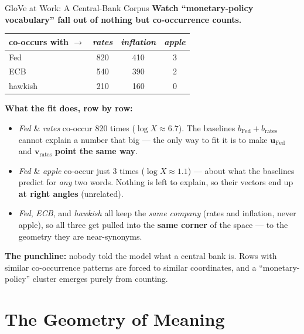 \begin{frame}{GloVe at Work: A Central-Bank Corpus}
\textbf{Watch ``monetary-policy vocabulary'' fall out of nothing but co-occurrence counts.}
\begin{center}
\footnotesize
\begin{tabular}{l c c c}
\toprule
 co-occurs with $\rightarrow$ & \emph{rates} & \emph{inflation} & \emph{apple} \\
\midrule
Fed      & 820 & 410 & 3 \\
ECB      & 540 & 390 & 2 \\
hawkish  & 210 & 160 & 0 \\
\bottomrule
\end{tabular}
\end{center}
\smallskip
\textbf{What the fit does, row by row:}
\begin{itemize}
\small
\item \emph{Fed} \& \emph{rates} co-occur 820 times ($\log X \approx 6.7$). The baselines $b_{\text{Fed}} + b_{\text{rates}}$ cannot explain a number that big --- the only way to fit it is to make $\mathbf{u}_{\text{Fed}}$ and $\mathbf{v}_{\text{rates}}$ \textbf{point the same way}.
\item \emph{Fed} \& \emph{apple} co-occur just 3 times ($\log X \approx 1.1$) --- about what the baselines predict for \emph{any} two words. Nothing is left to explain, so their vectors end up \textbf{at right angles} (unrelated).
\item \emph{Fed}, \emph{ECB}, and \emph{hawkish} all keep the \emph{same company} (rates and inflation, never apple), so all three get pulled into the \textbf{same corner} of the space --- to the geometry they are near-synonyms.
\end{itemize}
\smallskip
{\small \textbf{The punchline:} nobody told the model what a central bank is. Rows with similar co-occurrence patterns are forced to similar coordinates, and a ``monetary-policy'' cluster emerges purely from counting.}
\end{frame}

\section{The Geometry of Meaning}

